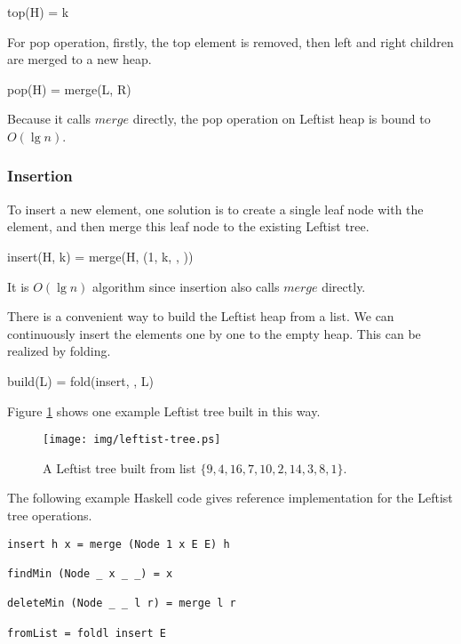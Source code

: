 \documentclass[UTF8]{article}
\begin{document}
\be
top(H) = k
\ee

For pop operation, firstly, the top element is removed, then
left and right children are merged to a new heap.

\be
pop(H) = merge(L, R)
\ee

Because it calls $merge$ directly, the pop operation on Leftist heap is bound
to $O(\lg n)$.

\subsubsection{Insertion}

To insert a new element, one solution is to create a single
leaf node with the element, and then merge this leaf node to
the existing Leftist tree.

\be
insert(H, k) = merge(H, (1, k, \phi, \phi))
\ee

It is $O(\lg n)$ algorithm since insertion also calls $merge$ directly.

There is a convenient way to build the Leftist heap from
a list. We can continuously insert the elements one by one
to the empty heap. This can be realized by folding.

\be
build(L) = fold(insert, \phi, L)
\ee

Figure \ref{fig:leftist-tree} shows one example Leftist tree
built in this way.

\begin{figure}[htbp]
   \begin{center}
   	  \texttt{[image: img/leftist-tree.ps]}
    \caption{A Leftist tree built from list $\{9, 4, 16, 7, 10, 2, 14, 3, 8, 1\}$.}
    \label{fig:leftist-tree}
   \end{center}
\end{figure}

The following example Haskell code gives reference implementation
for the Leftist tree operations.

\lstset{language=Haskell}
\begin{lstlisting}
insert h x = merge (Node 1 x E E) h

findMin (Node _ x _ _) = x

deleteMin (Node _ _ l r) = merge l r

fromList = foldl insert E
\end{lstlisting}

\end{document}
